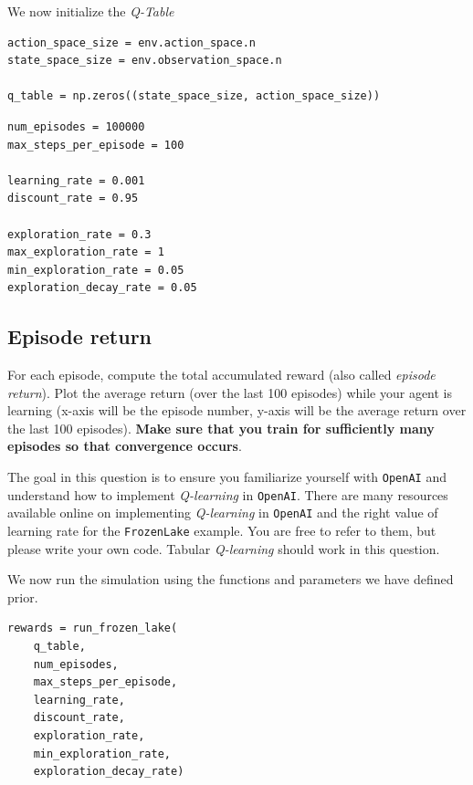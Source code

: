 \documentclass[12pt, letterpaper]{article}
\newcommand{\mybox}[1]{\par\noindent\colorbox{shadecolor}
{\parbox{\dimexpr\textwidth-2\fboxsep\relax}{#1}}}
\begin{document}
We now initialize the \textit{Q-Table}

\begin{mdframed}[backgroundcolor=shadecolor]
\begin{verbatim}
action_space_size = env.action_space.n
state_space_size = env.observation_space.n

q_table = np.zeros((state_space_size, action_space_size))
\end{verbatim}
\end{mdframed}

\begin{mdframed}[backgroundcolor=shadecolor]
\begin{verbatim}
num_episodes = 100000
max_steps_per_episode = 100

learning_rate = 0.001
discount_rate = 0.95

exploration_rate = 0.3
max_exploration_rate = 1
min_exploration_rate = 0.05
exploration_decay_rate = 0.05
\end{verbatim}
\end{mdframed}

\subsection{Episode return}
\mybox{For each episode, compute the total accumulated reward (also called \textit{episode return}). Plot the average return (over the last 100 episodes) while your agent is learning (x-axis will be the episode number, y-axis will be the average return over the last 100 episodes). \textbf{Make sure that you train for sufficiently many episodes so that convergence occurs}.

The goal in this question is to ensure you familiarize yourself with \texttt{OpenAI} and understand how to implement \textit{Q-learning} in \texttt{OpenAI}. 
There are many resources available online on implementing \textit{Q-learning} in \texttt{OpenAI} and the right value of learning rate for the \texttt{FrozenLake} example.
You are free to refer to them, but please write your own code. 
Tabular \textit{Q-learning} should work in this question.}

We now run the simulation using the functions and parameters we have defined prior.

\begin{mdframed}[backgroundcolor=shadecolor]
\begin{verbatim}
rewards = run_frozen_lake(
    q_table,
    num_episodes,
    max_steps_per_episode,
    learning_rate,
    discount_rate,
    exploration_rate,
    min_exploration_rate,
    exploration_decay_rate)
\end{verbatim}
\end{mdframed}
\end{document}
